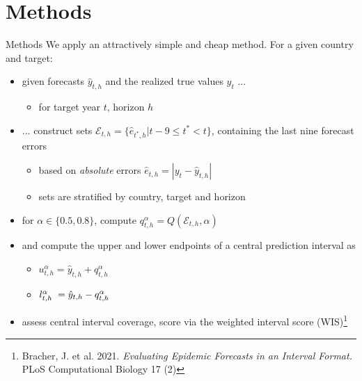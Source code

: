\documentclass[en]{sdqbeamer}
\begin{document}
\section{Methods}
\begin{frame}{Methods}
We apply an attractively simple and cheap method. For a given country and target:
\begin{itemize}
    \item given forecasts $\hat{y}_{t, h}$ and the realized true values $y_{t}$ ...
    \begin{itemize}
        \item for target year $t$, horizon $h$
    \end{itemize}
    \item ... construct sets $\mathcal{E}_{t, h} = \{\hat{e}_{t^*, h}  | t-9 \leq t^* < t \}$, containing the last nine forecast errors
    \begin{itemize}
        \item based on \textit{absolute} errors $\hat{e}_{t,h} = |y_{t} - \hat{y}_{t, h}| $
        \item sets are stratified by country, target and horizon
    \end{itemize}
    \item for $\alpha \in \{0.5, 0.8\}$, compute $q^{\alpha}_{t, h} =  Q\left(\mathcal{E}_{t, h}, \alpha \right)$
    \item and compute the upper and lower endpoints of a central prediction interval as 
    \begin{itemize}
        \item $u^{\alpha}_{t,h} = \hat{y}_{t, h} + q^{\alpha}_{t, h}$ 
        \item $l^{\alpha}_{t,h} \hspace{1mm} = \hat{y}_{t, h} - q^{\alpha}_{t, h}$
    \end{itemize}
    \item assess central interval coverage, score via the weighted interval score (WIS)\footnote{Bracher, J. et al. 2021. \textit{Evaluating
Epidemic Forecasts in an Interval Format.} PLoS Computational Biology 17 (2)}
\end{itemize}
    
\end{frame}
\end{document}
